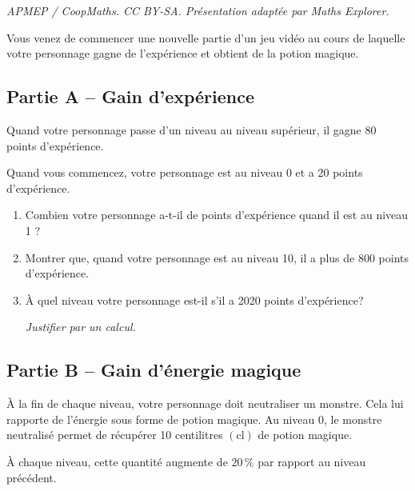 \documentclass[10pt]{article}
\begin{document}
\noindent\textit{APMEP / CoopMaths. CC BY-SA. Présentation adaptée par Maths Explorer.}\par\medskip
Vous venez de commencer une nouvelle partie d'un jeu vidéo au cours de laquelle votre personnage gagne de l'expérience et obtient de la potion magique.

\subsection*{Partie A -- Gain d'expérience}
	Quand votre personnage passe d'un niveau au niveau supérieur, il gagne 80 points d'expérience.

	Quand vous commencez, votre personnage est au niveau 0 et a 20 points d'expérience.

	\begin{enumerate}
		\item Combien votre personnage a-t-il de points d'expérience quand il est au niveau 1 ?

		\item Montrer que, quand votre personnage est au niveau 10, il a plus de 800 points d'expérience.

		\item À quel niveau votre personnage est-il s'il a 2020 points d'expérience?

		\emph{Justifier par un calcul.}
	\end{enumerate}



\subsection*{Partie B -- Gain d'énergie magique}
	À la fin de chaque niveau, votre personnage doit neutraliser un monstre. Cela lui rapporte de l'énergie sous forme de potion magique. Au niveau 0, le monstre neutralisé permet de récupérer 10 centilitres $(\mathrm{cl})$ de potion magique.

	À chaque niveau, cette quantité augmente de $20\,\%$ par rapport au niveau précédent.

	\medskip
\end{document}
